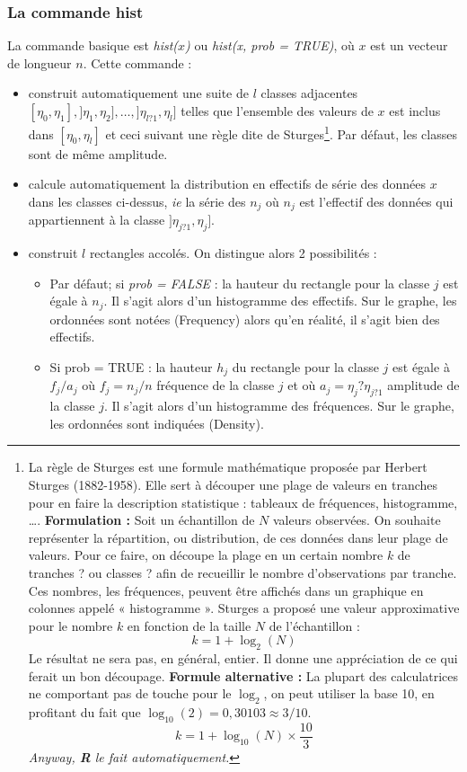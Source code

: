 \subsubsection{La commande hist}
La commande basique est \textit{hist($x$)} ou \textit{hist(x, prob = TRUE)}, où $x$ est un vecteur de longueur $n$.
Cette commande :
\begin{itemize}
\item construit automatiquement une suite de $l$ classes adjacentes $[\eta_{0},\eta_{1}],]\eta_{1},\eta_{2}],\dots,]\eta_{l?1},\eta_{l}]$ telles que l'ensemble des valeurs de $x$ est inclus dans $[\eta_{0},\eta_{l}]$ et ceci suivant une règle dite de Sturges\footnote{
  La règle de Sturges est une formule mathématique proposée par Herbert Sturges (1882-1958). Elle sert à découper une plage de valeurs en tranches pour en faire la description statistique : tableaux de fréquences, histogramme, \dots.\newline
  \textbf{Formulation :} Soit un échantillon de $N$ valeurs observées. On souhaite représenter la répartition, ou distribution, de ces données dans leur plage de valeurs. Pour ce faire, on découpe la plage en un certain nombre $k$ de tranches ? ou classes ? afin de recueillir le nombre d'observations par tranche. Ces nombres, les fréquences, peuvent être affichés dans un graphique en colonnes appelé « histogramme ».\newline
  Sturges a proposé une valeur approximative pour le nombre $k$ en fonction de la taille $N$ de l'échantillon :
$$k = 1+\log_{2}(N)$$
  Le résultat ne sera pas, en général, entier. Il donne une appréciation de ce qui ferait un bon découpage.  \newline
  \textbf{Formule alternative : } La plupart des calculatrices ne comportant pas de touche pour le $\log_{2}$, on peut utiliser la base 10, en profitant du fait que $\log_{10}(2) = 0,30103 \approx 3/10$.
$$ k=1+\log_{10}(N)\times \frac{10}{3}$$
\textit{Anyway, \textbf{R} le fait automatiquement.}
}.
Par défaut, les classes sont de même amplitude.
\item calcule automatiquement la distribution en effectifs de série des données $x$ dans les classes ci-dessus, \textit{ie} la série des $n_{j}$ où $n_{j}$ est l'effectif des données qui appartiennent à la classe $]\eta_{j?1},\eta_{j}]$.
\item construit $l$ rectangles accolés. On distingue alors 2 possibilités :
\begin{itemize}
\item Par défaut; si \textit{prob = FALSE} : la hauteur du rectangle pour la classe $j$ est égale à $n_{j}$. Il s'agit alors d'un histogramme des effectifs. Sur le graphe, les ordonnées sont notées (Frequency) alors qu'en réalité, il s'agit bien des effectifs.
\item Si prob = TRUE : la hauteur $h_{j}$ du rectangle pour la classe $j$ est égale à $f_{j}/a_{j}$ où $f_{j} = n_{j}/n$ fréquence de la classe $j$ et où $a_{j} = \eta_{j} ? \eta_{j?1}$ amplitude de la classe $j$. Il s'agit alors d'un histogramme des fréquences. Sur le graphe, les ordonnées sont indiquées (Density).
\end{itemize}
\end{itemize}
